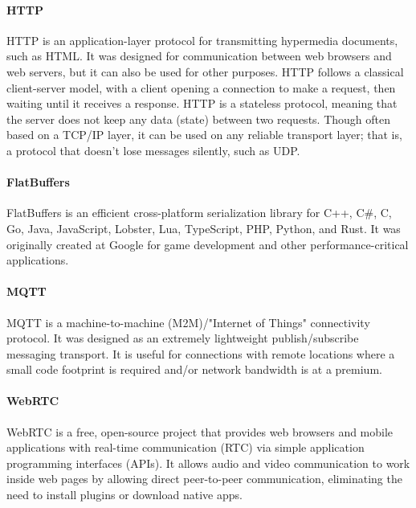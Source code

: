 \paragraph{HTTP}
HTTP is an application-layer protocol for transmitting hypermedia documents, such as HTML.
It was designed for communication between web browsers and web servers, but it can also be used for other purposes.
HTTP follows a classical client-server model, with a client opening a connection to make a request,
then waiting until it receives a response.
HTTP is a stateless protocol, meaning that the server does not keep any data (state) between two requests.
Though often based on a TCP/IP layer, it can be used on any reliable transport layer;
that is, a protocol that doesn't lose messages silently, such as UDP.

\paragraph{FlatBuffers}
FlatBuffers is an efficient cross-platform serialization library for C++, C\#, C, Go, Java, JavaScript, Lobster, Lua, TypeScript, PHP, Python, and Rust.
It was originally created at Google for game development and other performance-critical applications.

\paragraph{MQTT}
MQTT is a machine-to-machine (M2M)/"Internet of Things" connectivity protocol.
It was designed as an extremely lightweight publish/subscribe messaging transport.
It is useful for connections with remote locations where a small code footprint is required and/or network bandwidth is at a premium.

\paragraph{WebRTC}
WebRTC is a free, open-source project that provides web browsers and mobile applications with real-time communication (RTC) 
via simple application programming interfaces (APIs).
It allows audio and video communication to work inside web pages by allowing direct peer-to-peer communication,
eliminating the need to install plugins or download native apps.


